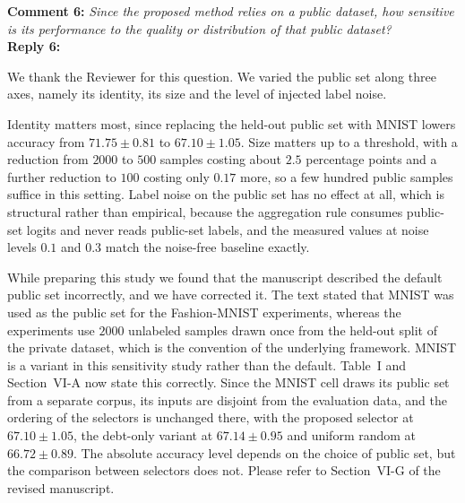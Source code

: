\documentclass[10pt]{article}
\begin{document}
\noindent
\textbf{Comment 6:} \textit{Since the proposed method relies on a public dataset, how sensitive is its performance to the quality or distribution of that public dataset?} \\
\noindent
\textbf{Reply 6:} {We thank the Reviewer for this question. We varied the public set along three axes, namely its identity, its size and the level of injected label noise.

Identity matters most, since replacing the held-out public set with MNIST lowers accuracy from $71.75 \pm 0.81$ to $67.10 \pm 1.05$. Size matters up to a threshold, with a reduction from $2000$ to $500$ samples costing about $2.5$ percentage points and a further reduction to $100$ costing only $0.17$ more, so a few hundred public samples suffice in this setting. Label noise on the public set has no effect at all, which is structural rather than empirical, because the aggregation rule consumes public-set logits and never reads public-set labels, and the measured values at noise levels $0.1$ and $0.3$ match the noise-free baseline exactly.

While preparing this study we found that the manuscript described the default public set incorrectly, and we have corrected it. The text stated that MNIST was used as the public set for the Fashion-MNIST experiments, whereas the experiments use $2000$ unlabeled samples drawn once from the held-out split of the private dataset, which is the convention of the underlying framework. MNIST is a variant in this sensitivity study rather than the default. Table~I and Section~VI-A now state this correctly. Since the MNIST cell draws its public set from a separate corpus, its inputs are disjoint from the evaluation data, and the ordering of the selectors is unchanged there, with the proposed selector at $67.10 \pm 1.05$, the debt-only variant at $67.14 \pm 0.95$ and uniform random at $66.72 \pm 0.89$. The absolute accuracy level depends on the choice of public set, but the comparison between selectors does not. Please refer to Section~VI-G of the revised manuscript.}\\

\end{document}
